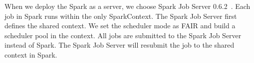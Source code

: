 
When we deploy the Spark as a server, we choose Spark Job Server 0.6.2~\cite{www:jobserver}. Each job in Spark runs within the only {\ttfamily \small SparkContext}. The Spark Job Server first defines the shared context. We set the scheduler mode as FAIR and build a scheduler pool in the context. 
All jobs are submitted to the Spark Job Server instead of Spark. The Spark Job Server will resubmit the job to the shared context in Spark. 
